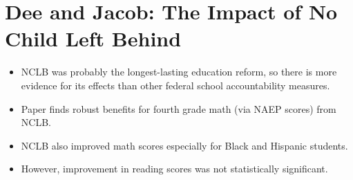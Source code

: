 \documentclass[10pt]{extarticle}
\begin{document}
  \section{Dee and Jacob: The Impact of No Child Left Behind}%
  \begin{itemize}
    \item NCLB was probably the longest-lasting education reform, so there is more evidence for its effects than other federal school accountability measures.
    \item Paper finds robust benefits for fourth grade math (via NAEP scores) from NCLB.
    \item NCLB also improved math scores especially for Black and Hispanic students.
    \item However, improvement in reading scores was not statistically significant.
  \end{itemize}
\end{document}
